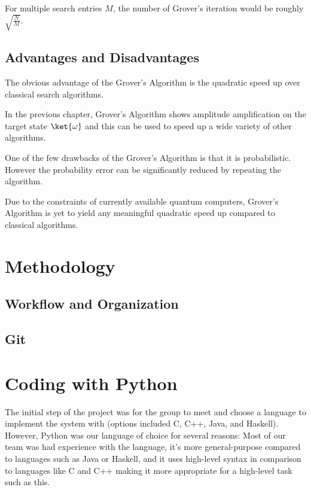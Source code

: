 \documentclass{article}
\begin{document}
\noindent
For multiple search entries $M$, the number of Grover's iteration would be roughly $\sqrt{\frac{N}{M}}$.
\vspace{10mm}

\subsection{Advantages and Disadvantages}
\vspace{5mm}

\noindent
The obvious advantage of the Grover's Algorithm is the quadratic speed up over classical search algorithms. 
\vspace{5mm}

\noindent
In the previous chapter, Grover's Algorithm shows amplitude amplification on the target state $\ket{\omega}$ and this can be used to speed up a wide variety of other algorithms\cite{noauthor_grovers_nodate}. 
\vspace{5mm}

\noindent
One of the few drawbacks of the Grover's Algorithm is that it is probabilistic. However the probability error can be significantly reduced by repeating the algorithm.
\vspace{5mm}

\noindent
Due to the constraints of currently available quantum computers, Grover's Algorithm is yet to yield any  meaningful quadratic speed up compared to classical algorithms\cite{noauthor_grovers_2022}.   
\pagebreak

\section{Methodology}

\subsection{Workflow and Organization}

\subsection{Git}

\section{Coding with Python}
The initial step of the project was for the group to meet and choose a language to implement the system with (options included C, C++, Java, and Haskell). However, Python was our language of choice for several reasons: Most of our team was had experience with the language, it’s more general-purpose compared to languages such as Java or Haskell, and it uses high-level syntax in comparison to languages like C and C++ making it more appropriate for a high-level task such as this.
\end{document}
